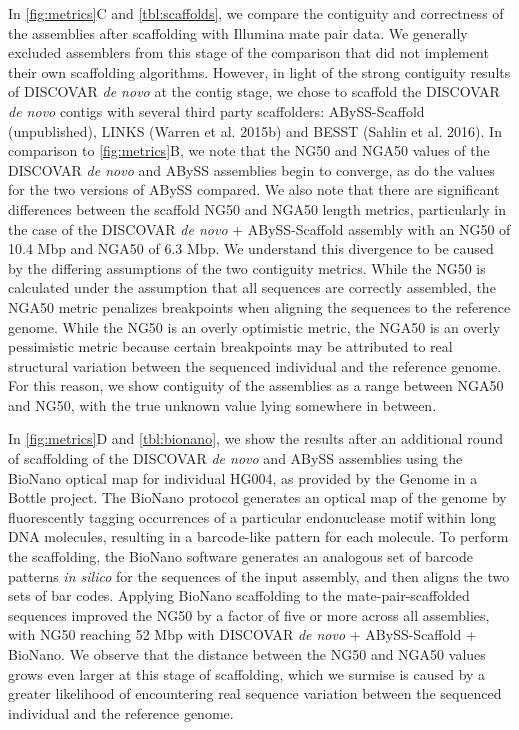 \documentclass[
  12pt,
  oneside,
  openany]{book}
\begin{document}
In \cref{fig:metrics}C and \cref{tbl:scaffolds}, we compare the contiguity and correctness of the assemblies after scaffolding with Illumina mate pair data. We generally excluded assemblers from this stage of the comparison that did not implement their own scaffolding algorithms. However, in light of the strong contiguity results of DISCOVAR \emph{de novo} at the contig stage, we chose to scaffold the DISCOVAR \emph{de novo} contigs with several third party scaffolders: ABySS-Scaffold (unpublished), LINKS (Warren et al. 2015b) and BESST (Sahlin et al. 2016). In comparison to \cref{fig:metrics}B, we note that the NG50 and NGA50 values of the DISCOVAR \emph{de novo} and ABySS assemblies begin to converge, as do the values for the two versions of ABySS compared. We also note that there are significant differences between the scaffold NG50 and NGA50 length metrics, particularly in the case of the DISCOVAR \emph{de novo} + ABySS-Scaffold assembly with an NG50 of 10.4 Mbp and NGA50 of 6.3 Mbp. We understand this divergence to be caused by the differing assumptions of the two contiguity metrics. While the NG50 is calculated under the assumption that all sequences are correctly assembled, the NGA50 metric penalizes breakpoints when aligning the sequences to the reference genome. While the NG50 is an overly optimistic metric, the NGA50 is an overly pessimistic metric because certain breakpoints may be attributed to real structural variation between the sequenced individual and the reference genome. For this reason, we show contiguity of the assemblies as a range between NGA50 and NG50, with the true unknown value lying somewhere in between.

In \cref{fig:metrics}D and \cref{tbl:bionano}, we show the results after an additional round of scaffolding of the DISCOVAR \emph{de novo} and ABySS assemblies using the BioNano optical map for individual HG004, as provided by the Genome in a Bottle project. The BioNano protocol generates an optical map of the genome by fluorescently tagging occurrences of a particular endonuclease motif within long DNA molecules, resulting in a barcode-like pattern for each molecule. To perform the scaffolding, the BioNano software generates an analogous set of barcode patterns \emph{in silico} for the sequences of the input assembly, and then aligns the two sets of bar codes. Applying BioNano scaffolding to the mate-pair-scaffolded sequences improved the NG50 by a factor of five or more across all assemblies, with NG50 reaching 52 Mbp with DISCOVAR \emph{de novo} + ABySS-Scaffold + BioNano. We observe that the distance between the NG50 and NGA50 values grows even larger at this stage of scaffolding, which we surmise is caused by a greater likelihood of encountering real sequence variation between the sequenced individual and the reference genome.
\end{document}
